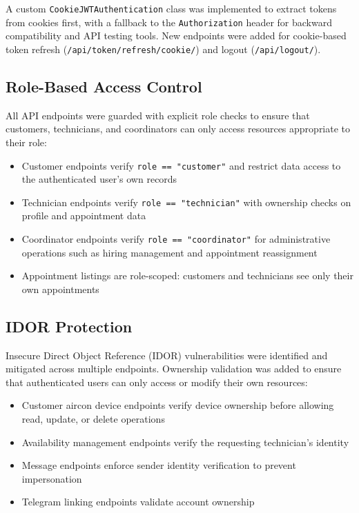 \documentclass[conference]{IEEEtran}
\begin{document}
A custom \texttt{CookieJWTAuthentication} class was implemented to extract tokens from cookies first, with a fallback to the \texttt{Authorization} header for backward compatibility and API testing tools. New endpoints were added for cookie-based token refresh (\texttt{/api/token/refresh/cookie/}) and logout (\texttt{/api/logout/}).

\subsection{Role-Based Access Control}

All API endpoints were guarded with explicit role checks to ensure that customers, technicians, and coordinators can only access resources appropriate to their role:

\begin{itemize}
    \item Customer endpoints verify \texttt{role == "customer"} and restrict data access to the authenticated user's own records
    \item Technician endpoints verify \texttt{role == "technician"} with ownership checks on profile and appointment data
    \item Coordinator endpoints verify \texttt{role == "coordinator"} for administrative operations such as hiring management and appointment reassignment
    \item Appointment listings are role-scoped: customers and technicians see only their own appointments
\end{itemize}

\subsection{IDOR Protection}

Insecure Direct Object Reference (IDOR) vulnerabilities were identified and mitigated across multiple endpoints. Ownership validation was added to ensure that authenticated users can only access or modify their own resources:

\begin{itemize}
    \item Customer aircon device endpoints verify device ownership before allowing read, update, or delete operations
    \item Availability management endpoints verify the requesting technician's identity
    \item Message endpoints enforce sender identity verification to prevent impersonation
    \item Telegram linking endpoints validate account ownership
\end{itemize}
\end{document}
